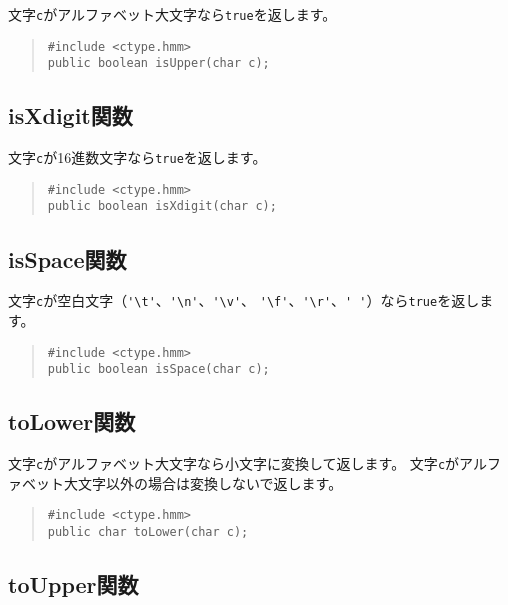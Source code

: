 文字\verb/c/がアルファベット大文字なら\verb/true/を返します。

\begin{quote}
\begin{verbatim}
#include <ctype.hmm>
public boolean isUpper(char c);
\end{verbatim}
\end{quote}

\subsection{isXdigit関数}

文字\verb/c/が16進数文字なら\verb/true/を返します。

\begin{quote}
\begin{verbatim}
#include <ctype.hmm>
public boolean isXdigit(char c);
\end{verbatim}
\end{quote}

\subsection{isSpace関数}

文字\verb/c/が空白文字（\verb/'\t'/、\verb/'\n'/、\verb/'\v'/、
\verb/'\f'/、\verb/'\r'/、\verb/' '/）なら\verb/true/を返します。

\begin{quote}
\begin{verbatim}
#include <ctype.hmm>
public boolean isSpace(char c);
\end{verbatim}
\end{quote}

\subsection{toLower関数}

文字\verb/c/がアルファベット大文字なら小文字に変換して返します。
文字\verb/c/がアルファベット大文字以外の場合は変換しないで返します。

\begin{quote}
\begin{verbatim}
#include <ctype.hmm>
public char toLower(char c);
\end{verbatim}
\end{quote}

\subsection{toUpper関数}

